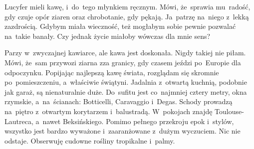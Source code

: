 \documentclass[9pt, a5paper]{memoir}
\begin{document}
Lucyfer mieli kawę, i~do~tego młynkiem ręcznym. Mówi, że~sprawia mu~radość, gdy czuje opór ziaren oraz chrobotanie, gdy pękają. Ja~patrzę na~niego z~lekką zazdrością. Gdybym miała wieczność, też mogłabym sobie pewnie pozwalać na~takie banały. Czy jednak życie miałoby wówczas dla mnie sens?

Parzy w~zwyczajnej kawiarce, ale kawa jest doskonała. Nigdy takiej nie piłam. Mówi, że~sam przywozi ziarna zza granicy, gdy czasem jeździ po~Europie dla odpoczynku. Popijając najlepszą kawę świata, rozglądam się skromnie po~pomieszczeniu, a~właściwie świątyni. Jadalnia z~otwartą kuchnią, podobnie jak garaż, są nienaturalnie duże. Do~sufitu jest co~najmniej cztery metry, okna rzymskie, a~na~ścianach: Botticelli, Caravaggio i~Degas. Schody prowadzą na~piętro z~otwartym korytarzem i~balustradą. W~pokojach znajdę Toulouse-Lautreca, a~nawet Beksińskiego. Pomimo pełnego przekroju epok i~stylów, wszystko jest bardzo wyważone i~zaaranżowane z~dużym wyczuciem. Nic nie odstaje. Obserwuję cudowne rośliny tropikalne i~palmy.
\end{document}
